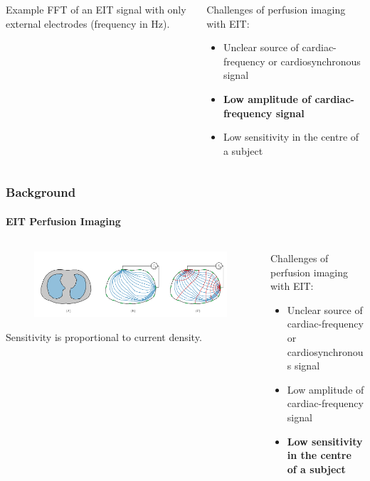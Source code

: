 \documentclass[10pt,    %
    english,            %
    xcolor=table,       %
    envcountsect,        %
    aspectratio=1610
]{beamer}
\begin{document}
\begin{frame}
\begin{columns}[c]
\begin{column}{0.5\textwidth}
\begin{figure}
	\end{figure}
	Example FFT of an EIT signal with only external electrodes (\alert{frequency in Hz}).
\end{column}
\begin{column}{0.5\textwidth}
	Challenges of perfusion imaging with EIT: \\ \vspace{5mm}
	\begin{itemize}
		\item Unclear source of cardiac-frequency or cardiosynchronous signal
		\item \textbf{Low amplitude of cardiac-frequency signal}
		\item Low sensitivity in the centre of a subject
	\end{itemize}
\end{column}
\end{columns}
\end{frame}

\begin{frame}
	\frametitle{Background}
	\framesubtitle{EIT Perfusion Imaging}
\begin{columns}[c]
\begin{column}{0.5\textwidth}
	\begin{figure}
		\centering
	\includegraphics[width=\textwidth,trim={16cm 3cm 16cm 0},clip]{imgs/current_and_equipotential_lines.pdf}
	\end{figure}
	\alert{Sensitivity} is proportional to \alert{current density}.
\end{column}
\begin{column}{0.5\textwidth}
	Challenges of perfusion imaging with EIT: \\ \vspace{5mm}
	\begin{itemize}
		\item Unclear source of cardiac-frequency or cardiosynchronous signal
		\item Low amplitude of cardiac-frequency signal
		\item \textbf{Low sensitivity in the centre of a subject}
	\end{itemize}
\end{column}
\end{columns}
\end{frame}
\end{document}
